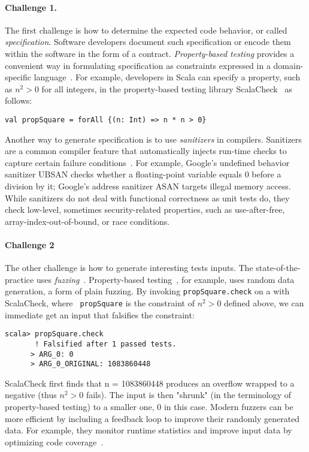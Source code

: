\documentclass[fleqn,12pt]{article}
\begin{document}
\paragraph{Challenge 1.}
The first challenge is how to determine the expected code behavior, or
called \emph{specification}.  Software developers document such
specification or encode them within the software in the form of a
contract. \emph{Property-based testing} provides a convenient way in
formulating specification as constraints expressed in a
domain-specific language~\cite{DBLP:conf/icfp/ClaessenH00}.  For
example, developers in Scala can specify a property, such as $n^2>0$
for all integers, in the property-based testing library
ScalaCheck~\cite{nilsson2014scalacheck} as follows:
\begin{lstlisting}[numbers=none]
val propSquare = forAll {(n: Int) => n * n > 0}
\end{lstlisting}

Another way to generate specification is to use \emph{sanitizers} in
compilers. Sanitizers are a common compiler feature that automatically
injects run-time checks to capture certain failure
conditions~\cite{DBLP:conf/usenix/SerebryanyBPV12}. For example,
Google's undefined behavior sanitizer UBSAN checks whether a
floating-point variable equals 0 before a division by it; Google's
address sanitizer ASAN targets illegal memory access. While sanitizers
do not deal with functional correctness as unit tests do, they check
low-level, sometimes security-related properties, such as
use-after-free, array-index-out-of-bound, or race conditions.

\paragraph{Challenge 2}
The other challenge is how to generate interesting tests inputs.  The
state-of-the-practice  uses
\emph{fuzzing}~\cite{takanen2018fuzzing}. Property-based testing~\cite{DBLP:conf/icfp/ClaessenH00},
for example, uses random data generation, a form of plain fuzzing.  By
invoking {\tt propSquare.check} on a with ScalaCheck, where {\tt
  propSquare} is the constraint of $n^2>0$ defined above, we can
immediate get an input that falsifies the constraint:

\begin{lstlisting}[numbers=none]
scala> propSquare.check
       ! Falsified after 1 passed tests.
      > ARG_0: 0
      > ARG_0_ORIGINAL: 1083860448
\end{lstlisting}
 ScalaCheck first finds that n = 1083860448 produces an overflow
 wrapped to a negative (thus $n^2>0$ fails). The input is then
 "shrunk" (in the terminology of property-based testing) to a smaller
 one, 0 in this case.  Modern fuzzers can be more efficient by
 including a feedback loop to improve their randomly generated
 data. For example, they monitor runtime statistics and improve input
 data by optimizing code
 coverage~\cite{DBLP:journals/tse/BohmePR19,DBLP:conf/pldi/FuS17}.
\end{document}
